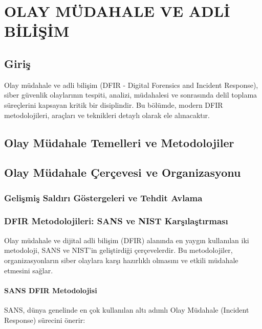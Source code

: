\chapter{OLAY MÜDAHALE VE ADLİ BİLİŞİM}

\section*{Giriş}
Olay müdahale ve adli bilişim (DFIR - Digital Forensics and Incident Response), siber güvenlik olaylarının tespiti, analizi, müdahalesi ve sonrasında delil toplama süreçlerini kapsayan kritik bir disiplindir. Bu bölümde, modern DFIR metodolojileri, araçları ve teknikleri detaylı olarak ele alınacaktır.



\section{Olay Müdahale Temelleri ve Metodolojiler}\section{Olay Müdahale Çerçevesi ve Organizasyonu}



\subsection{Gelişmiş Saldırı Göstergeleri ve Tehdit Avlama}\subsection{DFIR Metodolojileri: SANS ve NIST Karşılaştırması}

Olay müdahale ve dijital adli bilişim (DFIR) alanında en yaygın kullanılan iki metodoloji, SANS ve NIST'in geliştirdiği çerçevelerdir. Bu metodolojiler, organizasyonların siber olaylara karşı hazırlıklı olmasını ve etkili müdahale etmesini sağlar.

\subsubsection{SANS DFIR Metodolojisi}

SANS, dünya genelinde en çok kullanılan altı adımlı Olay Müdahale (Incident Response) sürecini önerir:

